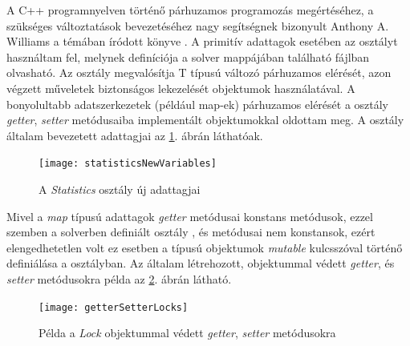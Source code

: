 A C++ programnyelven történő párhuzamos programozás megértéséhez, a szükséges változtatások bevezetéséhez nagy segítségnek bizonyult Anthony A. Williams a témában íródott könyve \cite{CppConcurrency}. 
A primitív adattagok esetében az  osztályt használtam fel, melynek definíciója a solver  mappájában található  fájlban olvasható.
Az osztály megvalósítja T típusú változó párhuzamos elérését, azon végzett műveletek biztonságos lekezelését  objektumok használatával.
A bonyolultabb adatszerkezetek (például map-ek) párhuzamos elérését a  osztály \textit{getter}, \textit{setter} metódusaiba implementált  objektumokkal oldottam meg.
A  osztály általam bevezetett adattagjai az \ref{StatisticsVariables}. ábrán láthatóak.
\begin{figure}[H]
\begin{center}
\texttt{[image: statisticsNewVariables]}
\caption{A \textit{Statistics} osztály új adattagjai}
\label{StatisticsVariables}
\end{center}
\end{figure}
Mivel a \textit{map} típusú adattagok \textit{getter} metódusai konstans metódusok, ezzel szemben a solverben definiált  osztály , és  metódusai nem konstansok, ezért elengedhetetlen volt ez esetben a  típusú objektumok \textit{mutable} kulcsszóval történő definiálása a  osztályban.
Az általam létrehozott,  objektummal védett \textit{getter}, és \textit{setter} metódusokra példa az \ref{GetterSetterLock}. ábrán látható.
\begin{figure}[H]
\begin{center}
\texttt{[image: getterSetterLocks]}
\caption{Példa a \textit{Lock} objektummal védett \textit{getter}, \textit{setter} metódusokra}
\label{GetterSetterLock}
\end{center}
\end{figure}
